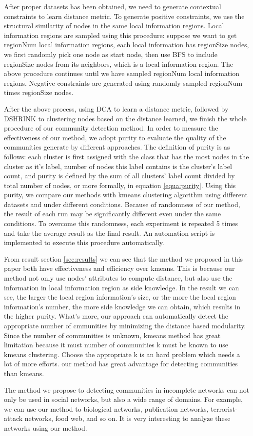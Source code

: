 After proper datasets has been obtained, we need to generate contextual constraints 
to learn distance metric. To generate positive constraints, 
we use the structural similarity of nodes in the same local information regions.  
Local information regions are sampled using this procedure:
suppose we want to get regionNum local information regions, each local information has 
regionSize nodes, we first randomly pick one node as start node, then use BFS to include 
regionSize nodes from its neighbors, which is a local information region. The above procedure continues until we have sampled 
regionNum local information regions. Negative constraints are generated using 
randomly sampled regionNum times regionSize nodes.

After the above process, using DCA to learn a distance metric, followed by DSHRINK to clustering nodes 
based on the distance learned, we finish the whole procedure of our community detection method.
In order to measure the effectiveness of our method, we adopt purity to evaluate the quality of the 
communities generate by different approaches. The definition of purity is as follows:
each cluster is first assigned with the class that has the most nodes in the cluster as it's label,
number of nodes this label contains is the cluster's label count,
and purity is defined by the sum of all clusters' label count divided by total number of nodes, 
or more formally, in equation \ref{equa:purity}. Using this purity, 
we compare our methods with kmeans clustering algorithm using different datasets 
and under different conditions. Because of randomness of our method, 
the result of each run may be significantly different even under the same conditions.  
To overcome this randomness, each experiment is repeated 5 times and take the 
average result as the final result.
An automation script is implemented to execute this procedure automatically.  

From result section \ref{sec:results} we can see that the method we proposed in this paper
both have effectiveness and efficiency over kmeans.
This is because our method not only use nodes' attributes
to compute distance, but also use 
the information in local information region as side knowledge.
In the result we can see, 
the larger the local region information's size,
or the more the local region information's number,
the more side knowledge we can obtain,
which results in the higher purity.
What's more, 
our approach can automatically detect the appropriate number of cmmunities by minimizing the 
distance based modularity. Since the number of communities is unknown, 
kmeans method has great limitation because it must number of communities k must be known to
use kmeans clustering. Choose the appropriate k is an hard problem which needs a lot of more 
efforts. our method has great advantage for detecting communities than kmeans.

The method we propose to detecting communities in incomplete networks 
can not only be used in social networks, but also a wide range of domains.
For example, we can use our method to biological networks, publication networks,
terrorist-attack networks, food web, and so on. 
It is very interesting to analyze these networks using our method. 

